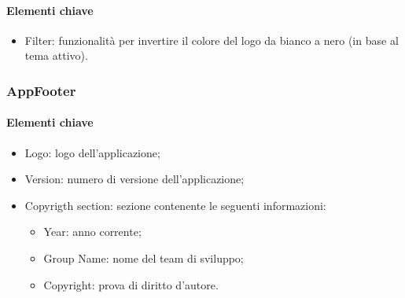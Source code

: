 \paragraph*{Elementi chiave}
\begin{itemize}
  \item Filter: funzionalità per invertire il colore del logo da bianco a nero (in base al tema attivo).
\end{itemize}

\subsubsection{AppFooter}

\paragraph*{Elementi chiave}
\begin{itemize}
  \item Logo: logo dell'applicazione;
  \item Version: numero di versione dell'applicazione;
  \item Copyrigth section: sezione contenente le seguenti informazioni:
  \begin{itemize}
    \item Year: anno corrente;
    \item Group Name: nome del team di sviluppo;
    \item Copyright: prova di diritto d'autore.
  \end{itemize}
\end{itemize}